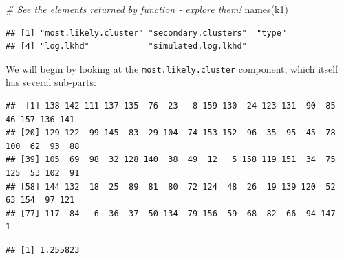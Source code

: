 \documentclass[
]{book}
\newenvironment{Shaded}{\begin{snugshade}}{\end{snugshade}}
\newcommand{\CommentTok}[1]{\textcolor[rgb]{0.56,0.35,0.01}{\textit{#1}}}
\newcommand{\FunctionTok}[1]{\textcolor[rgb]{0.00,0.00,0.00}{#1}}
\newcommand{\NormalTok}[1]{#1}
\newcommand{\SpecialCharTok}[1]{\textcolor[rgb]{0.00,0.00,0.00}{#1}}
\begin{document}
\begin{Shaded}
\begin{Highlighting}[]
\CommentTok{\# See the elements returned by function {-} explore them!}
\FunctionTok{names}\NormalTok{(k1) }
\end{Highlighting}
\end{Shaded}

\begin{verbatim}
## [1] "most.likely.cluster" "secondary.clusters"  "type"               
## [4] "log.lkhd"            "simulated.log.lkhd"
\end{verbatim}

We will begin by looking at the \texttt{most.likely.cluster} component, which itself has several sub-parts:

\begin{Shaded}
\end{Shaded}

\begin{verbatim}
##  [1] 138 142 111 137 135  76  23   8 159 130  24 123 131  90  85  46 157 136 141
## [20] 129 122  99 145  83  29 104  74 153 152  96  35  95  45  78 100  62  93  88
## [39] 105  69  98  32 128 140  38  49  12   5 158 119 151  34  75 125  53 102  91
## [58] 144 132  18  25  89  81  80  72 124  48  26  19 139 120  52  63 154  97 121
## [77] 117  84   6  36  37  50 134  79 156  59  68  82  66  94 147   1
\end{verbatim}

\begin{Shaded}
\end{Shaded}

\begin{verbatim}
## [1] 1.255823
\end{verbatim}

\begin{Shaded}
\end{Shaded}
\end{document}
